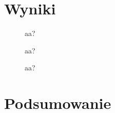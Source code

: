 \documentclass[11pt]{extarticle}
\begin{document}
	\section{Wyniki}

	\begin{figure}[H]
		\begin{center}
			
		\end{center}
		\caption{aa?}
		\label{ch1}
	\end{figure}
	\begin{figure}[H]
		\begin{center}
			
		\end{center}
		\caption{aa?}
		\label{ch2}
	\end{figure}
	\begin{figure}[H]
		\begin{center}
			
		\end{center}
		\caption{aa?}
		\label{ch3}
	\end{figure}

	\section{Podsumowanie}
\end{document}
